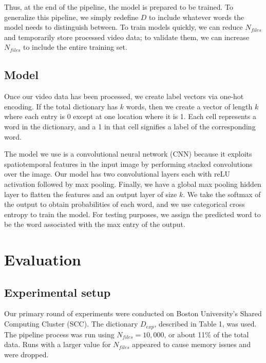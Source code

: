 \documentclass{article}
\begin{document}
Thus, at the end of the pipeline, the model is prepared to be trained. To generalize this pipeline, we simply redefine $D$ to include whatever words the model needs to distinguish between. To train models quickly, we can reduce $N_{files}$ and temporarily store processed video data; to validate them, we can increase $N_{files}$ to include the entire training set.

\subsection{Model}

Once our video data has been processed, we create label vectors via one-hot encoding. If the total dictionary has $k$ words, then we create a vector of length $k$ where each entry is 0 except at one location where it is 1. Each cell represents a word in the dictionary, and a 1 in that cell signifies a label of the corresponding word.

The model we use is a convolutional neural network (CNN) because it exploits spatiotemporal features in the input image by performing stacked convolutions over the image. Our model has two convolutional layers each with reLU activation followed by max pooling. Finally, we have a global max pooling hidden layer to flatten the features and an output layer of size $k$. We take the softmax of the output to obtain probabilities of each word, and we use categorical cross entropy to train the model. For testing purposes, we assign the predicted word to be the word associated with the max entry of the output.

\section{Evaluation}

\subsection{Experimental setup}

Our primary round of experiments were conducted on Boston University's Shared Computing Cluster (SCC). The dictionary $D_{exp}$, described in Table 1, was used. The pipeline process was run using $N_{files} = 10,000$, or about 11\% of the total data. Runs with a larger value for $N_{files}$ appeared to cause memory issues and were dropped.
\end{document}
